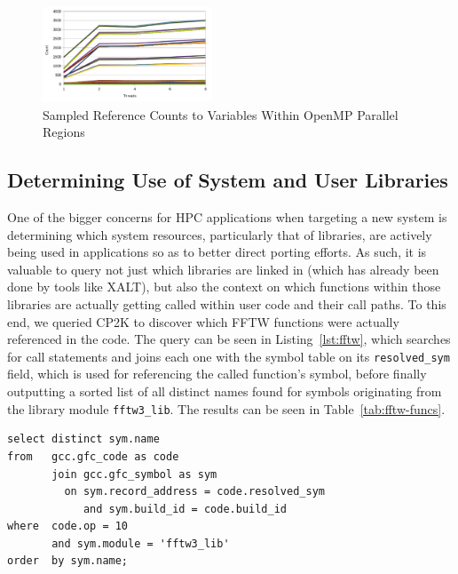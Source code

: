 \begin{figure}
\begin{center}
\includegraphics[width=0.45\textwidth]{images/cp2k-omp-inc-full.pdf}
\end{center}
\caption{Sampled Reference Counts to Variables Within OpenMP Parallel Regions}
\label{fig:openmp-refcount}
\end{figure}

\subsection{Determining Use of System and User Libraries}
One of the bigger concerns for \acs{HPC} applications when targeting a new system is determining 
which system resources, 
particularly that of libraries, are actively being used in applications so as to better direct porting 
efforts.
As such, it is valuable to query not just which libraries are linked in (which has already been done by  
tools like XALT), but also the context on which functions within those libraries are actually getting 
called within user code and their call paths.
To this end, we queried CP2K to discover which \ac{FFTW} functions were actually referenced in the 
code.
The query can be seen in Listing~\ref{lst:fftw}, which searches for call statements and joins each one 
with the symbol table on its \texttt{resolved\_sym} field, which is 
used for referencing the called function's symbol, before finally outputting a sorted list of all distinct 
names found for symbols originating from the library module \texttt{fftw3\_lib}.
The results can be seen in Table~\ref{tab:fftw-funcs}.

\begin{lstlisting}[caption=Querying for Use of Library Functions, label=lst:fftw]
select distinct sym.name
from   gcc.gfc_code as code
       join gcc.gfc_symbol as sym
         on sym.record_address = code.resolved_sym
            and sym.build_id = code.build_id
where  code.op = 10
       and sym.module = 'fftw3_lib'
order  by sym.name;
\end{lstlisting}

